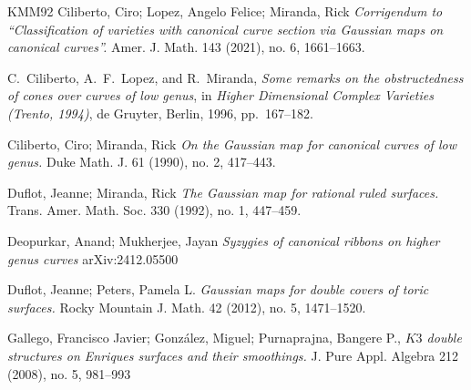 \documentclass[11pt,twoside]{amsart}
\theoremstyle{plain}
\numberwithin{equation}{section}
\theoremstyle{definition}
\begin{document}
\begin{thebibliography}{KMM92}
Ciliberto, Ciro; Lopez, Angelo Felice; Miranda, Rick
\emph{Corrigendum to ``Classification of varieties with canonical curve section via Gaussian maps on canonical curves''.}
Amer. J. Math. 143 (2021), no. 6, 1661–1663.

C.~Ciliberto, A.~F.~Lopez, and R.~Miranda,
\newblock \emph{Some remarks on the obstructedness of cones over curves of low genus},
\newblock in \emph{Higher Dimensional Complex Varieties (Trento, 1994)},
de Gruyter, Berlin, 1996, pp.~167--182.

Ciliberto, Ciro; Miranda, Rick
\emph{On the Gaussian map for canonical curves of low genus.}
Duke Math. J. 61 (1990), no. 2, 417–443.

Duflot, Jeanne; Miranda, Rick
\emph{The Gaussian map for rational ruled surfaces.}
Trans. Amer. Math. Soc. 330 (1992), no. 1, 447–459.

Deopurkar, Anand; Mukherjee, Jayan
\emph{Syzygies of canonical ribbons on higher genus curves}
arXiv:2412.05500


Duflot, Jeanne; Peters, Pamela L.
\emph{Gaussian maps for double covers of toric surfaces.}
Rocky Mountain J. Math. 42 (2012), no. 5, 1471–1520.













 

\color{black}




Gallego, Francisco Javier; González, Miguel; Purnaprajna, Bangere P., 
\emph{$K3$ double structures on Enriques surfaces and their smoothings.}
J. Pure Appl. Algebra 212 (2008), no. 5, 981--993


\end{thebibliography}
\end{document}
